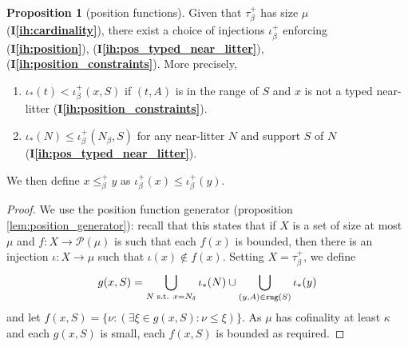 \documentclass{article}
\theoremstyle{definition}
\newtheorem{proposition}[theorem]{Proposition}
\theoremstyle{remark}
\newcommand{\ihref}[1]{(\textbf{I\ref{#1}})}
\begin{document}
{
\begin{proposition}[position functions]
Given that $\tau_\beta^+$ has size $\mu$ \ihref{ih:cardinality}, there exist a choice of injections $\iota^+_\beta$
enforcing \ihref{ih:position}, \ihref{ih:pos_typed_near_litter}, \ihref{ih:position_constraints}.
More precisely,

\begin{enumerate}

\item $\iota_*(t) < \iota^+_\beta(x,S)$ if $(t,A)$ is in the range of $S$ and $x$ is not a typed near-litter {\ihref{ih:position_constraints}}.

\item $\iota_*(N) \leq \iota^+_\beta(N_\beta,S)$ for any near-litter $N$ and support $S$ of $N$
  \ihref{ih:pos_typed_near_litter}.

\end{enumerate}

We then define $x \leq^+_\beta y$ as $\iota^+_\beta(x) \leq \iota^+_\beta(y)$.
\end{proposition}
\begin{proof}
We use the position function generator (proposition \ref{lem:position_generator}): recall that this states that if $X$ is a set of size at most $\mu$ and $f : X \to \mathcal P(\mu)$ is such that each $f(x)$ is bounded, then there is an injection $\iota : X \to \mu$ such that $\iota(x) \not\in f(x)$.
Setting $X = \tau^+_\beta$, we define
$$ g(x, S) = \bigcup_{N \text{ s.t. } x = N_\delta} \iota_*(N) \cup \bigcup_{(y,A) \in {\tt rng}(S)} \iota_*(y) $$
and let $f(x, S) = \{ \nu : (\exists \xi \in g(x, S) : \nu \leq \xi) \}$.
As $\mu$ has cofinality at least $\kappa$ and each $g(x, S)$ is small, each $f(x, S)$ is bounded as required.
\end{proof}
}
\end{document}
